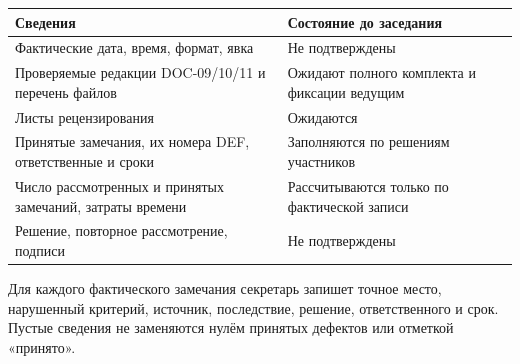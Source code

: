 \documentclass[12pt,a4paper]{article}
\newcounter{none} %
\begin{document}
{\def\LTcaptype{none} %
\begin{longtable}[]{@{}
  >{\raggedright\arraybackslash}p{}
  >{\raggedright\arraybackslash}p{}@{}}
\toprule\noalign{}
\begin{minipage}[b]{\linewidth}\raggedright
Сведения
\end{minipage} & \begin{minipage}[b]{\linewidth}\raggedright
Состояние до заседания
\end{minipage} \\
\midrule\noalign{}
\endhead
\bottomrule\noalign{}
\endlastfoot
Фактические дата, время, формат, явка & Не подтверждены \\
Проверяемые редакции DOC-09/10/11 и перечень файлов & Ожидают полного комплекта и фиксации ведущим \\
Листы рецензирования & Ожидаются \\
Принятые замечания, их номера DEF, ответственные и сроки & Заполняются по решениям участников \\
Число рассмотренных и принятых замечаний, затраты времени & Рассчитываются только по фактической записи \\
Решение, повторное рассмотрение, подписи & Не подтверждены \\
\end{longtable}
}

Для каждого фактического замечания секретарь запишет точное место, нарушенный критерий, источник, последствие, решение, ответственного и срок. Пустые сведения не заменяются нулём принятых дефектов или отметкой «принято».
\end{document}
